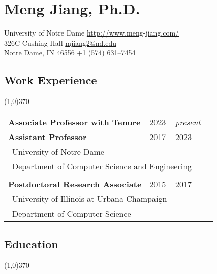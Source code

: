 \documentclass[10pt]{article}
\begin{document}
\setcounter{secnumdepth}{0}

\thispagestyle{firststyle}

\section{\LARGE{\sc Meng Jiang, Ph.D.}}
University of Notre Dame \hfill \url{http://www.meng-jiang.com/} \\
326C Cushing Hall \hfill \url{mjiang2@nd.edu}\\
Notre Dame, IN 46556 \hfill +1 (574) 631--7454

\subsection{\sc Work Experience}
\vspace{-0.4cm} \line(1,0){370} \vspace{0.1cm}

\begin{table}[h!]
\begin{tabular*}{12.7cm}{p{10.0cm}p{3.25cm}r}
\bf{Associate Professor with Tenure}&2023 -- \emph{present}\\	
\bf{Assistant Professor}&2017 -- 2023\\
 \multicolumn{2}{l}{~{University of Notre Dame}}\\
 \multicolumn{2}{l}{~{Department of Computer Science and Engineering}}\\
\\
\bf{Postdoctoral Research Associate}&2015 -- 2017\\
 \multicolumn{2}{l}{~{University of Illinois at Urbana-Champaign}}\\
 \multicolumn{2}{l}{~{Department of Computer Science}} \\
\end{tabular*}
\end{table}
\vspace{-0.4cm}

\vspace{-0.2cm}
\subsection{\sc Education}
\vspace{-0.4cm} \line(1,0){370} \vspace{-0.1cm}
\end{document}
